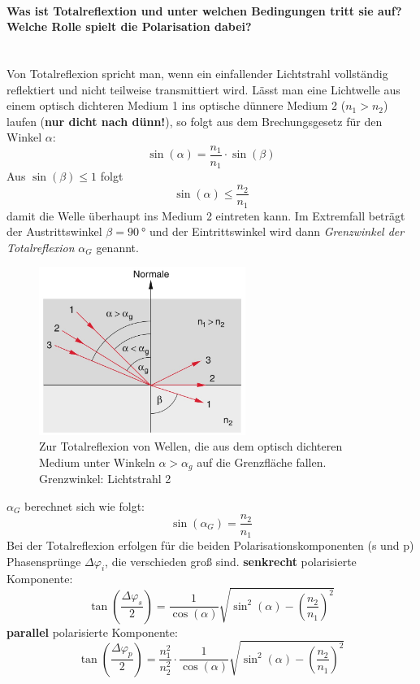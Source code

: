 \documentclass[a4paper, 11pt, ngerman, parskip=half-]{scrartcl}
\newcommand{\myparagraph}[1]{\paragraph{#1}\mbox{}\\}
\begin{document}
\myparagraph{Was ist Totalreflextion und unter welchen Bedingungen tritt sie auf? Welche Rolle spielt die Polarisation dabei?}
%
%
Von Totalreflexion spricht man, wenn ein einfallender Lichtstrahl vollständig reflektiert und nicht teilweise transmittiert wird.
Lässt man eine Lichtwelle aus einem optisch dichteren Medium 1 ins optische dünnere Medium 2 ($n_1 > n_2$) laufen (\textbf{nur dicht nach dünn!}), so folgt aus dem Brechungsgesetz für den Winkel $\alpha$:
%
\[\sin(\alpha) = \frac{n_1}{n_1} \cdot \sin(\beta)\]
%
Aus $\sin(\beta) \leq 1$ folgt
%
\[\sin(\alpha) \leq \frac{n_2}{n_1}\]
%
damit die Welle überhaupt ins Medium 2 eintreten kann. Im Extremfall beträgt der Austrittswinkel $\beta = \SI{90}{\degree}$ und der Eintrittswinkel wird dann \textit{Grenzwinkel der Totalreflexion} $\alpha_G$ genannt.
%
\begin{figure}[H]
    \centering
    \begin{samepage}
        \includegraphics[width=0.6\textwidth]{image/15/totalreflexion.jpg}
        \caption{Zur Totalreflexion von Wellen, die aus dem optisch
            dichteren Medium unter Winkeln $\alpha > \alpha_g$ auf die Grenzfläche fallen. Grenzwinkel: Lichtstrahl 2}
        \label{fig:totalreflexion}
    \end{samepage}
\end{figure}
%
$\alpha_G$ berechnet sich wie folgt:
\begin{equation}
    \label{eq:grenzwinkel_totalreflexion}
    \sin(\alpha_G) = \frac{n_2}{n_1}
\end{equation}
%
Bei der Totalreflexion erfolgen für die beiden Polarisationskomponenten (s und p) Phasensprünge $\Delta \varphi_i$, die verschieden groß sind.
%
\textbf{senkrecht} polarisierte Komponente:
%
\begin{equation}
    \label{eq:totalreflexion_s_polarisation}
    \tan(\frac{\Delta \varphi_s}{2}) = \frac{1}{\cos(\alpha)} \sqrt{\sin^2(\alpha) - \left(\frac{n_2}{n_1}\right)^2}
\end{equation}
%
\textbf{parallel} polarisierte Komponente:
%
\begin{equation}
    \label{eq:totalreflexion_p_polarisation}
    \tan(\frac{\Delta \varphi_p}{2}) = \frac{n_1^2}{n_2^2} \cdot \frac{1}{\cos(\alpha)} \sqrt{\sin^2(\alpha) - \left(\frac{n_2}{n_1}\right)^2}
\end{equation}
\end{document}
